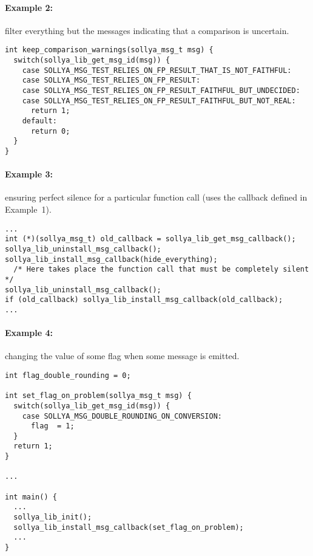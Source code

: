 \documentclass[a4paper]{article}
\begin{document}
\paragraph{Example 2:} filter everything but the messages indicating that a comparison is uncertain.
\begin{center}
\begin{minipage}{15cm}\begin{Verbatim}[frame=single]
int keep_comparison_warnings(sollya_msg_t msg) {
  switch(sollya_lib_get_msg_id(msg)) {
    case SOLLYA_MSG_TEST_RELIES_ON_FP_RESULT_THAT_IS_NOT_FAITHFUL:
    case SOLLYA_MSG_TEST_RELIES_ON_FP_RESULT:
    case SOLLYA_MSG_TEST_RELIES_ON_FP_RESULT_FAITHFUL_BUT_UNDECIDED:
    case SOLLYA_MSG_TEST_RELIES_ON_FP_RESULT_FAITHFUL_BUT_NOT_REAL:
      return 1;
    default:
      return 0;
  }
}
\end{Verbatim}
\end{minipage}\end{center}

\paragraph{Example 3:} ensuring perfect silence for a particular function call (uses the callback defined in Example~1).
\begin{center}
\begin{minipage}{15cm}\begin{Verbatim}[frame=single]
...
int (*)(sollya_msg_t) old_callback = sollya_lib_get_msg_callback();
sollya_lib_uninstall_msg_callback();
sollya_lib_install_msg_callback(hide_everything);
  /* Here takes place the function call that must be completely silent */
sollya_lib_uninstall_msg_callback();
if (old_callback) sollya_lib_install_msg_callback(old_callback);
...
\end{Verbatim}
\end{minipage}\end{center}

\paragraph{Example 4:} changing the value of some flag when some message is emitted.
\begin{center}
\begin{minipage}{15cm}\begin{Verbatim}[frame=single]
int flag_double_rounding = 0;

int set_flag_on_problem(sollya_msg_t msg) {
  switch(sollya_lib_get_msg_id(msg)) {
    case SOLLYA_MSG_DOUBLE_ROUNDING_ON_CONVERSION:
      flag  = 1;
  }
  return 1;
}

...

int main() {
  ...
  sollya_lib_init();
  sollya_lib_install_msg_callback(set_flag_on_problem);
  ...
}

\end{Verbatim}
\end{minipage}\end{center}
\end{document}

